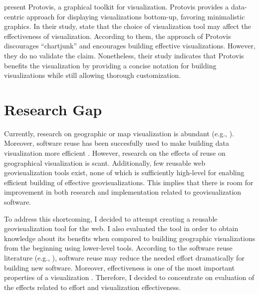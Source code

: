 \citet{bostock_protovis:_2009} present Protovis, a graphical toolkit for visualization. Protovis provides a data-centric approach for displaying visualizations bottom-up, favoring minimalistic graphics. In their study, \citeauthor{bostock_protovis:_2009} state that the choice of visualization tool may affect the effectiveness of visualization. According to them, the approach of Protovis discourages ``chartjunk'' and encourages building effective visualizations. However, they do no validate the claim. Nonetheless, their study indicates that Protovis benefits the visualization by providing a concise notation for building visualizations while still allowing thorough customization.

\section{Research Gap}

Currently, research on geographic or map visualization is abundant (e.g., \citealt{kraak_cartographic_1998,kraak_cartography_2011,slocum_thematic_2014,schlichtmann_visualization_2002}). Moreover, software reuse has been succesfully used to make building data visualization more efficient \citep{heer_prefuse:_2005,bostock_protovis:_2009}. However, research on the effects of reuse on geographical visualization is scant. Additionally, few reusable web geovisualization tools exist, none of which is sufficiently high-level for enabling efficient building of effective geovisualizations. This implies that there is room for improvement in both research and implementation related to geovisualization software.

To address this shortcoming, I decided to attempt creating a reusable geovisualization tool for the web. I also evaluated the tool in order to obtain knowledge about its benefits when compared to building geographic visualizations from the beginning using lower-level tools. According to the software reuse literature (e.g., \citealt{mohagheghi_empirical_2008,boehm_managing_1999}), software reuse may reduce the needed effort dramatically for building new software. Moreover, effectiveness is one of the most important properties of a visualization \citep{kraak_cartographic_1998}. Therefore, I decided to concentrate on evaluation of the effects related to effort and visualization effectiveness.